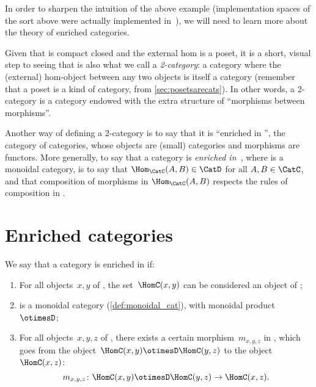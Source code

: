 In order to sharpen the intuition of the above example (implementation spaces of the sort above were actually implemented in~\cite{censi}), we will need to learn more about the theory of enriched categories.

Given that \DP is compact closed and the external hom is a poset, it is a short, visual step to seeing that \DP is also what we call a \emph{2-category}: a category where the (external) hom-object between any two objects is itself a category (remember that a poset is a kind of category, from \cref{sec:posetsarecats}). In other words, a 2-category is a category endowed with the extra structure of ``morphisms between morphisms''.

Another way of defining a 2-category is to say that it is ``enriched in \Category'', the category of categories, whose objects are (small) categories and morphisms are functors. More generally, to say that a category \CatC is \emph{enriched in~\CatD}, where \CatD is a monoidal category, is to say that $\Hom_\CatC(A,B) \in \CatD$ for all $A,B \in \CatC$, and that composition of morphisms in $\Hom_\CatC(A,B)$ respects the rules of composition in \CatD.


\section{Enriched categories}\label{sec:enrichment-enriched-categories}

\begin{ctdefinition}
  \label{def:enriched-category}
  We say that a category \CatC is enriched in \CatD if:
  \begin{enumerate}
    \item For all objects~$x, y$ of \CatC, the set~$\HomC(x,y)$ can be considered an object of \CatD;
    \item \CatD is a monoidal category (\cref{def:monoidal_cat}),
    with monoidal product~$\otimesD$;
    \item For all objects~$x, y, z$ of \CatC, there exists
    a certain morphism~$m_{x,y,z}$ in \CatD,
    which goes from the object~$\HomC(x, y) \otimesD \HomC(y, z)$ to the object~$\HomC(x, z)$:
    \begin{equation}
      \label{eq:enriched-condition}
      m_{x,y,z} \colon \HomC(x, y) \otimesD \HomC(y, z) \to \HomC(x, z).
    \end{equation}
  \end{enumerate}
\end{ctdefinition}


